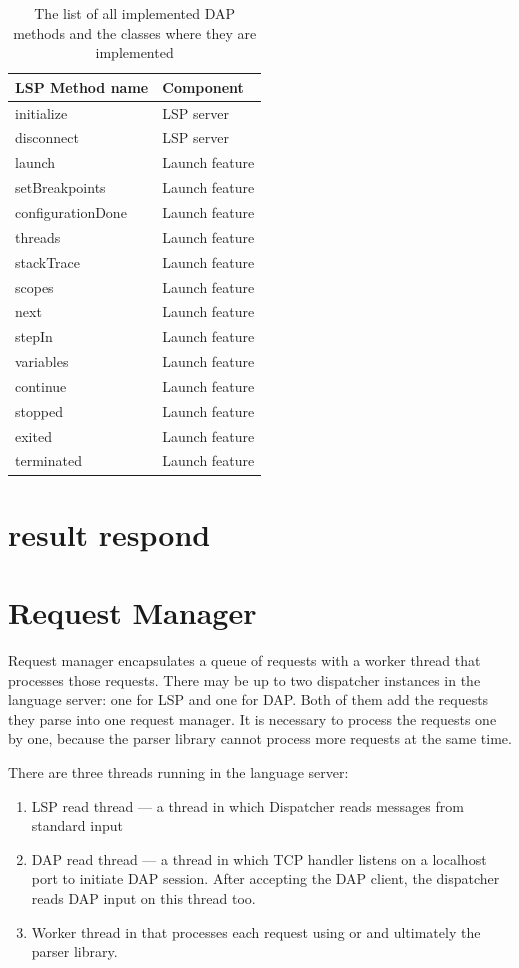 \begin{longtable}{ll}
	\caption{The list of all implemented DAP methods and the classes where they are implemented}
	\label{DAP_methods}   \\ \toprule
	\textbf{LSP Method name} & \textbf{Component} \\ \midrule
	initialize  & LSP server     \\
	disconnect    & LSP server     \\
	launch & Launch feature \\
	setBreakpoints  &  Launch feature    \\
	configurationDone  & Launch feature     \\
	threads  &  Launch feature    \\
	stackTrace & Launch feature \\
	scopes  & Launch feature     \\
	next  & Launch feature     \\
	stepIn  & Launch feature     \\
	variables  & Launch feature     \\
	continue  & Launch feature \\
 stopped & Launch feature \\
 exited  & Launch feature \\
 terminated & Launch feature \\\bottomrule
\end{longtable}

\section{result respond}

\section{Request Manager}

Request manager encapsulates a queue of requests with a worker thread that processes those requests. There may be up to two dispatcher instances in the language server: one for LSP and one for DAP. Both of them add the requests they parse into one request manager. It is necessary to process the requests one by one, because the parser library cannot process more requests at the same time.

There are three threads running in the language server:
\begin{enumerate}
	\item LSP read thread --- a thread in which Dispatcher reads messages from standard input
	\item DAP read thread --- a thread in which TCP handler listens on a localhost port to initiate DAP session. After accepting the DAP client, the dispatcher reads DAP input on this thread too.
	\item Worker thread in that processes each request using  or  and ultimately the parser library.
\end{enumerate}

